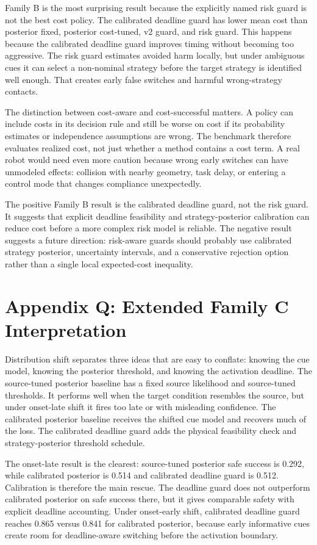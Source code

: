 \documentclass{article}
\begin{document}
Family B is the most surprising result because the explicitly named risk guard is not the best cost policy. The calibrated deadline guard has lower mean cost than posterior fixed, posterior cost-tuned, v2 guard, and risk guard. This happens because the calibrated deadline guard improves timing without becoming too aggressive. The risk guard estimates avoided harm locally, but under ambiguous cues it can select a non-nominal strategy before the target strategy is identified well enough. That creates early false switches and harmful wrong-strategy contacts.

The distinction between cost-aware and cost-successful matters. A policy can include costs in its decision rule and still be worse on cost if its probability estimates or independence assumptions are wrong. The benchmark therefore evaluates realized cost, not just whether a method contains a cost term. A real robot would need even more caution because wrong early switches can have unmodeled effects: collision with nearby geometry, task delay, or entering a control mode that changes compliance unexpectedly.

The positive Family B result is the calibrated deadline guard, not the risk guard. It suggests that explicit deadline feasibility and strategy-posterior calibration can reduce cost before a more complex risk model is reliable. The negative result suggests a future direction: risk-aware guards should probably use calibrated strategy posterior, uncertainty intervals, and a conservative rejection option rather than a single local expected-cost inequality.

\section{Appendix Q: Extended Family C Interpretation}

Distribution shift separates three ideas that are easy to conflate: knowing the cue model, knowing the posterior threshold, and knowing the activation deadline. The source-tuned posterior baseline has a fixed source likelihood and source-tuned thresholds. It performs well when the target condition resembles the source, but under onset-late shift it fires too late or with misleading confidence. The calibrated posterior baseline receives the shifted cue model and recovers much of the loss. The calibrated deadline guard adds the physical feasibility check and strategy-posterior threshold schedule.

The onset-late result is the clearest: source-tuned posterior safe success is 0.292, while calibrated posterior is 0.514 and calibrated deadline guard is 0.512. Calibration is therefore the main rescue. The deadline guard does not outperform calibrated posterior on safe success there, but it gives comparable safety with explicit deadline accounting. Under onset-early shift, calibrated deadline guard reaches 0.865 versus 0.841 for calibrated posterior, because early informative cues create room for deadline-aware switching before the activation boundary.
\end{document}

